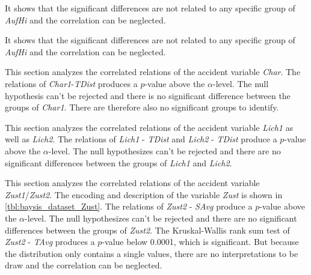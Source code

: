  

It shows that the significant differences are not related to any specific group of \textit{AufHi} and the correlation can be neglected.

It shows that the significant differences are not related to any specific group of \textit{AufHi} and the correlation can be neglected.

This section analyzes the correlated relations of the accident variable \textit{Char}. The relations of \textit{Char1}-\textit{TDist} produces a $p$-value above the $\alpha$-level. The null hypothesis can't be rejected and there is no significant difference between the groups of \textit{Char1}. There are therefore also no significant groups to identify.

This section analyzes the correlated relations of the accident variable \textit{Lich1} as well as \textit{Lich2}. The relations of \textit{Lich1} - \textit{TDist} and \textit{Lich2} - \textit{TDist} produce a $p$-value above the $\alpha$-level. The null hypothesizes can't be rejected and there are no significant differences between the groups of \textit{Lich1} and \textit{Lich2}.

This section analyzes the correlated relations of the accident variable \textit{Zust1}/\textit{Zust2}. The encoding and description of the variable \textit{Zust} is shown in \cref{tbl:baysis_dataset_Zust}. The relations of \textit{Zust2} - \textit{SAvg} produce a $p$-value above the $\alpha$-level. The null hypothesizes can't be rejected and there are no significant differences between the groups of \textit{Zust2}. The Kruskal-Wallis rank sum test of \textit{Zust2} - \textit{TAvg} produces a $p$-value below 0.0001, which is significant. But because the distribution only contains a single values, there are no interpretations to be draw and the correlation can be neglected.

